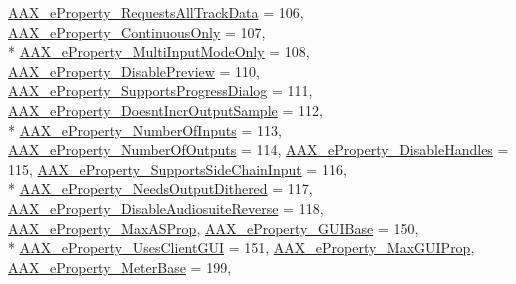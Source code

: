 \begin{DoxyCompactItemize}
\hyperlink{a00283_a6571f4e41a5dd06e4067249228e2249eaa59caaf3d7c3e195a32b8cb09a9baac2}{A\+A\+X\+\_\+e\+Property\+\_\+\+Requests\+All\+Track\+Data} = 106, 
\hyperlink{a00283_a6571f4e41a5dd06e4067249228e2249ea95054276be8782d93437cd74669366d0}{A\+A\+X\+\_\+e\+Property\+\_\+\+Continuous\+Only} = 107, 
\\*
\hyperlink{a00283_a6571f4e41a5dd06e4067249228e2249eaa15cf3edd899af4a98fa18fcdfdeb9d6}{A\+A\+X\+\_\+e\+Property\+\_\+\+Multi\+Input\+Mode\+Only} = 108, 
\hyperlink{a00283_a6571f4e41a5dd06e4067249228e2249ea854fdc19ab908b67aa3bc1f4262aa288}{A\+A\+X\+\_\+e\+Property\+\_\+\+Disable\+Preview} = 110, 
\hyperlink{a00283_a6571f4e41a5dd06e4067249228e2249eab9a9782ae1aed57b2f2cd6acd1081b38}{A\+A\+X\+\_\+e\+Property\+\_\+\+Supports\+Progress\+Dialog} = 111, 
\hyperlink{a00283_a6571f4e41a5dd06e4067249228e2249eaaf6b47f0861af74ef5c5bb316481b97d}{A\+A\+X\+\_\+e\+Property\+\_\+\+Doesnt\+Incr\+Output\+Sample} = 112, 
\\*
\hyperlink{a00283_a6571f4e41a5dd06e4067249228e2249ea00ed3da39077c52ef259f350837fc981}{A\+A\+X\+\_\+e\+Property\+\_\+\+Number\+Of\+Inputs} = 113, 
\hyperlink{a00283_a6571f4e41a5dd06e4067249228e2249eab7e07d482d3b6e527fc13bbc9f4eaf63}{A\+A\+X\+\_\+e\+Property\+\_\+\+Number\+Of\+Outputs} = 114, 
\hyperlink{a00283_a6571f4e41a5dd06e4067249228e2249ea943c37cd8a41a4d271dd28c89b518044}{A\+A\+X\+\_\+e\+Property\+\_\+\+Disable\+Handles} = 115, 
\hyperlink{a00283_a6571f4e41a5dd06e4067249228e2249ea3399fcd8ff459de1e3de0c98d40a5094}{A\+A\+X\+\_\+e\+Property\+\_\+\+Supports\+Side\+Chain\+Input} = 116, 
\\*
\hyperlink{a00283_a6571f4e41a5dd06e4067249228e2249ea38a26f7d914d391cef1f71acfb98a2ec}{A\+A\+X\+\_\+e\+Property\+\_\+\+Needs\+Output\+Dithered} = 117, 
\hyperlink{a00283_a6571f4e41a5dd06e4067249228e2249eab4eefd3dd46fb71883fff754c4f90a57}{A\+A\+X\+\_\+e\+Property\+\_\+\+Disable\+Audiosuite\+Reverse} = 118, 
\hyperlink{a00283_a6571f4e41a5dd06e4067249228e2249eac1731b45ed9daa8380c224c9d2b4050a}{A\+A\+X\+\_\+e\+Property\+\_\+\+Max\+A\+S\+Prop}, 
\hyperlink{a00283_a6571f4e41a5dd06e4067249228e2249ea045b9ab3f8a4f63f9c62e1dffc1952aa}{A\+A\+X\+\_\+e\+Property\+\_\+\+G\+U\+I\+Base} = 150, 
\\*
\hyperlink{a00283_a6571f4e41a5dd06e4067249228e2249eaf48412738dcfcc56046718d9e5a034d7}{A\+A\+X\+\_\+e\+Property\+\_\+\+Uses\+Client\+G\+U\+I} = 151, 
\hyperlink{a00283_a6571f4e41a5dd06e4067249228e2249eac890d1ef36591e3ae16917ba7d9f9203}{A\+A\+X\+\_\+e\+Property\+\_\+\+Max\+G\+U\+I\+Prop}, 
\hyperlink{a00283_a6571f4e41a5dd06e4067249228e2249eaa2aac06f000e364af20507103d6b0943}{A\+A\+X\+\_\+e\+Property\+\_\+\+Meter\+Base} = 199, 

\end{DoxyCompactItemize}
